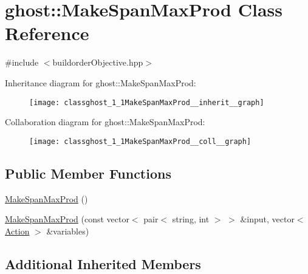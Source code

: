 \hypertarget{classghost_1_1MakeSpanMaxProd}{\section{ghost\-:\-:Make\-Span\-Max\-Prod Class Reference}
\label{classghost_1_1MakeSpanMaxProd}
}


{\ttfamily \#include $<$buildorder\-Objective.\-hpp$>$}



Inheritance diagram for ghost\-:\-:Make\-Span\-Max\-Prod\-:
\nopagebreak
\begin{figure}[H]
\begin{center}
\leavevmode
\texttt{[image: classghost\_1\_1MakeSpanMaxProd\_\_inherit\_\_graph]}
\end{center}
\end{figure}


Collaboration diagram for ghost\-:\-:Make\-Span\-Max\-Prod\-:
\nopagebreak
\begin{figure}[H]
\begin{center}
\leavevmode
\texttt{[image: classghost\_1\_1MakeSpanMaxProd\_\_coll\_\_graph]}
\end{center}
\end{figure}
\subsection*{Public Member Functions}
\begin{DoxyCompactItemize}
\item 
\hyperlink{classghost_1_1MakeSpanMaxProd_a704e8a4cf63b8380cf05977441d4ba6c}{Make\-Span\-Max\-Prod} ()
\item 
\hyperlink{classghost_1_1MakeSpanMaxProd_ac0b0ad3d8d7b5aab182a96aac115b125}{Make\-Span\-Max\-Prod} (const vector$<$ pair$<$ string, int $>$ $>$ \&input, vector$<$ \hyperlink{classghost_1_1Action}{Action} $>$ \&variables)
\end{DoxyCompactItemize}
\subsection*{Additional Inherited Members}


